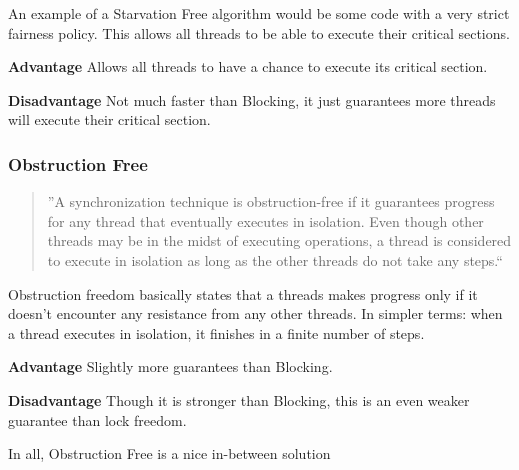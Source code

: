 \documentclass[letterpaper, 11pt]{article}
\begin{document}
An example of a Starvation Free algorithm would be some code with a very strict fairness 
policy. This allows all threads to be able to execute their critical sections.
\par\vspace{\baselineskip}

{\bfseries Advantage}\newline
Allows all threads to have a chance to execute its critical section.
\par\vspace{\baselineskip}

{\bfseries Disadvantage}\newline
Not much faster than Blocking, it just guarantees more threads will execute their critical section.

\subsubsection{Obstruction Free}

\begin{quotation}
''A synchronization technique is obstruction-free if it  guarantees progress for any 
thread that  eventually executes  in  isolation. Even  though other  threads  may  be  
in the  midst  of  executing operations,  a  thread  is  considered to execute in 
isolation as long as the other threads do not take any steps.`` \citep{obsfree}
\end{quotation}

Obstruction freedom basically states that a threads makes progress only if it doesn't encounter 
any resistance from any other threads. In simpler terms: when a thread executes in isolation, 
it finishes in a finite number of steps\citep{artofmulti}.

\par\vspace{\baselineskip}
{\bfseries Advantage}\newline
Slightly more guarantees than Blocking.
\par\vspace{\baselineskip}

{\bfseries Disadvantage}\newline
Though it is stronger than Blocking, this is an even weaker guarantee than lock freedom.

\par\vspace{\baselineskip}
In all, Obstruction Free is a nice in-between solution
\end{document}
